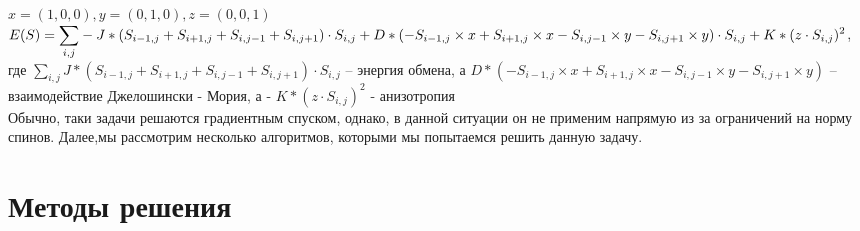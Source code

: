 \documentclass[ 12pt,x11names]{article}
\begin{document}
    $x = (1,0, 0), y = (0,1, 0), z =(0, 0 , 1)$\\
    $E(S) = \displaystyle{\sum_{i, j}} - J* (S_{i - 1, j} + S_{i + 1, j} + S_{i, j - 1} + S_{i, j + 1}) \cdot S_{i,j} + \\
    D * (-S_{i - 1, j} \times x  + S_{i + 1, j} \times x - S_{i, j - 1} \times y - S_{i, j + 1} \times y)\cdot S_{i,j}
    + \\
    K * (z \cdot S_{i,j}) ^ 2$,\\
    где
    $\displaystyle{\sum_{i, j}} J* (S_{i - 1, j} + S_{i + 1, j} + S_{i, j - 1} + S_{i, j + 1}) \cdot S_{i,j}$ -- энергия обмена, а $D * (-S_{i - 1, j} \times x  + S_{i + 1, j} \times x - S_{i, j - 1} \times y - S_{i, j + 1} \times y)$  -- взаимодействие Джелошински - Мория, а - $K * (z \cdot S_{i,j}) ^ 2$ - анизотропия\\
    Обычно, таки задачи решаются градиентным спуском, однако, в данной ситуации он не применим напрямую из за ограничений на норму спинов.
    Далее,мы рассмотрим несколько алгоритмов, которыми мы попытаемся решить данную задачу.
    \newpage
    \section{Методы решения}
\end{document}
